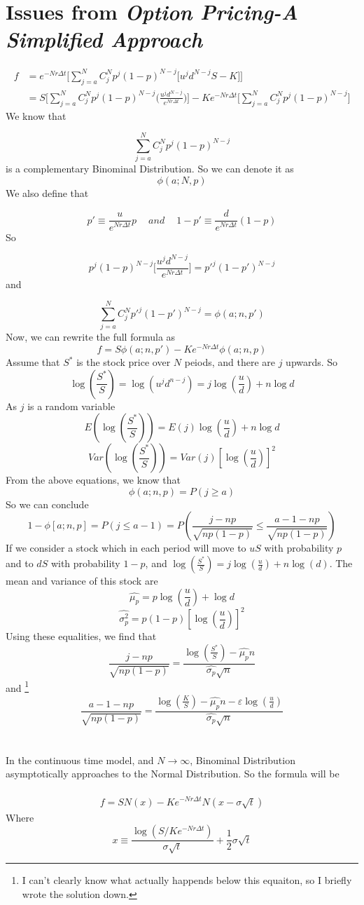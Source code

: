 \documentclass[12pt]{article}
\begin{document}
\section{Issues from \emph{Option Pricing-A Simplified Approach}}
\begin{align*}
    f &= e^{-Nr\Delta t} \Bigg[\sum_{j=a}^N C^N_j p^j (1-p)^{N-j} \big[u^j d^{N-j}S-K\big]\Bigg]\\
    & = S\Bigg[\sum_{j=a}^N C^N_j p^j (1-p)^{N-j} \Bigg(\frac{u^j d^{N-j}}{e^{Nr\Delta t}}\Bigg)\Bigg]-Ke^{-Nr\Delta t}\Bigg[\sum_{j=a}^N C^N_j p^j (1-p)^{N-j}\Bigg]
\end{align*}
We know that 

\[
    \sum_{j=a}^N C^N_j p^j (1-p)^{N-j}
\]
is a complementary Binominal Distribution. So we can denote it as
\[
    \phi(a;N,p)
\]
We also define that

\[
    p'\equiv \frac{u}{e^{Nr\Delta t}}p\quad\  and\quad\  1-p' \equiv \frac{d}{e^{Nr\Delta t}}(1-p)
\]
So

\[
    p^j (1-p)^{N-j} \Bigg[\frac{u^j d^{N-j}}{e^{Nr\Delta t}}\Bigg]=p'^j (1-p')^{N-j}
\]
and

\[
    \sum_{j=a}^N C^N_j p'^j (1-p')^{N-j} = \phi(a;n,p')
\]
Now, we can rewrite the full formula as
\[
    f = S\phi(a;n,p')-Ke^{-Nr\Delta t}\phi(a;n,p)
\]
Assume that $S^*$ is the stock price over $N$ peiods, and there are $j$ upwards. So
\[
    \log(\frac{S^*}{S}) = \log(u^j d^{n-j}) = j\log(\frac{u}{d})+n\log d  
\]
As $j$ is a random variable
\[
    E(\log(\frac{S^*}{S})) = E(j)\log(\frac{u}{d})+n\log d  
\]
\[
    Var(\log(\frac{S^*}{S})) = Var(j)[\log(\frac{u}{d})]^2
\]
\newpage
From the above equations, we know that
\[
    \phi(a;n,p) = P(j\ge a)  
\]
So we can conclude
\[
    1-\phi[a;n,p] = P(j\leq a-1) = P(\frac{j-np}{\sqrt{np(1-p)}}\leq \frac{a-1-np}{\sqrt{np(1-p)}})  
\]
If we consider a stock which in each period will move to $uS$ with probability $p$ and to $dS$ with probability $1-p$, and $\log(\frac{S^*}{S}) = j\log(\frac{u}{d})+n\log(d)$. The mean and variance of this stock are
\[
    \hat{\mu_p} = p\log(\frac{u}{d})+\log d 
\]
\[
    \hat{\sigma^2_p} = p(1-p)[\log(\frac{u}{d})]^2  
\]
Using these equalities, we find that
\[
    \frac{j-np}{\sqrt{np(1-p)}} = \frac{\log(\frac{S^*}{S}) - \hat{\mu_p}n}{\hat{\sigma_p}\sqrt{n}}
\] 
and \footnote[1]{I can't clearly know what actually happends below this equaiton, so I briefly wrote the solution down.}
\[
    \frac{a-1-np}{\sqrt{np(1-p)}} = \frac{\log(\frac{K}{S}) - \hat{\mu_p}n - \varepsilon\log(\frac{u}{d})}{\hat{\sigma_p}\sqrt{n}}  
\]
\\\\
In the continuous time model, and $N\to\infty$, Binominal Distribution asymptotically approaches to the Normal Distribution. So the formula will be\\\\
\begin{align*}
    f = SN(x)-Ke^{-Nr\Delta t}N(x-\sigma \sqrt{t})
\end{align*}
Where
\[
    x \equiv \frac{\log(S/Ke^{-Nr\Delta t})}{\sigma \sqrt{t}}
+\frac{1}{2}\sigma \sqrt{t}\]
 
\end{document}
